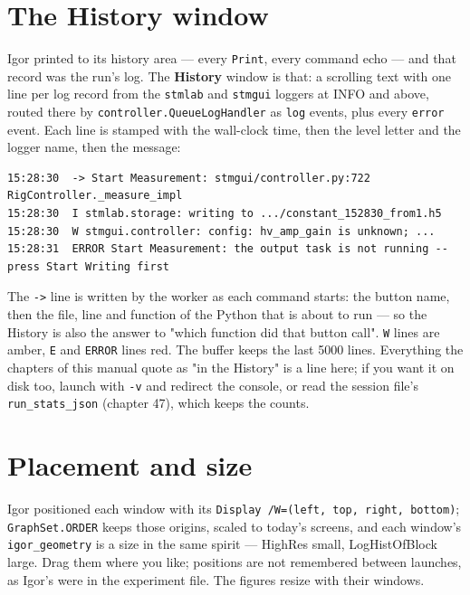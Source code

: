 \section{The History window}

Igor printed to its history area --- every \texttt{Print}, every command echo --- and that record was the run's log. The \textbf{History} window is that: a scrolling text with one line per log record from the \texttt{stmlab} and \texttt{stmgui} loggers at INFO and above, routed there by \texttt{controller.\discretionary{}{}{}Queue\discretionary{}{}{}Log\discretionary{}{}{}Handler} as \texttt{log} events, plus every \texttt{error} event. Each line is stamped with the wall-clock time, then the level letter and the logger name, then the message:

\begin{lstlisting}[style=out]
15:28:30  -> Start Measurement: stmgui/controller.py:722 RigController._measure_impl
15:28:30  I stmlab.storage: writing to .../constant_152830_from1.h5
15:28:30  W stmgui.controller: config: hv_amp_gain is unknown; ...
15:28:31  ERROR Start Measurement: the output task is not running -- press Start Writing first
\end{lstlisting}

The \texttt{->} line is written by the worker as each command starts: the button name, then the file, line and function of the Python that is about to run --- so the History is also the answer to "which function did that button call". \texttt{W} lines are amber, \texttt{E} and \texttt{ERROR} lines red. The buffer keeps the last 5000 lines. Everything the chapters of this manual quote as "in the History" is a line here; if you want it on disk too, launch with \texttt{-v} and redirect the console, or read the session file's \texttt{run\_\discretionary{}{}{}stats\_\discretionary{}{}{}json} (chapter 47), which keeps the counts.

\section{Placement and size}

Igor positioned each window with its \texttt{Display /\discretionary{}{}{}W=(left,\discretionary{}{}{} top,\discretionary{}{}{} right,\discretionary{}{}{} bottom)}; \texttt{Graph\discretionary{}{}{}Set.\discretionary{}{}{}ORDER} keeps those origins, scaled to today's screens, and each window's \texttt{igor\_\discretionary{}{}{}geometry} is a size in the same spirit --- HighRes small, LogHistOfBlock large. Drag them where you like; positions are not remembered between launches, as Igor's were in the experiment file. The figures resize with their windows.

